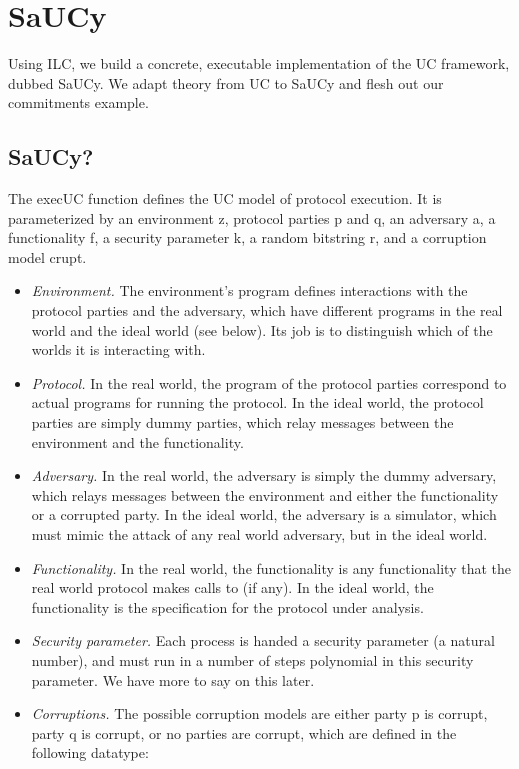 \section{SaUCy}
\label{sec:saucy}

Using ILC, we build a concrete, executable implementation of the UC framework,
dubbed SaUCy. We adapt theory from UC to SaUCy and flesh out our commitments
example.

\subsection{SaUCy?}
\label{subsec:saucy}

The \textsf{execUC} function defines the UC model of protocol execution. It is
parameterized by an environment \textsf{z}, protocol parties \textsf{p} and
\textsf{q}, an adversary \textsf{a}, a functionality \textsf{f}, a security
parameter \textsf{k}, a random bitstring \textsf{r}, and a corruption model
\textsf{crupt}.

\begin{itemize}[leftmargin=*]
  \item \emph{Environment.} The environment's program defines interactions with
    the protocol parties and the adversary, which have different programs in the
    real world and the ideal world (see below). Its job is to distinguish which
    of the worlds it is interacting with.
  \item \emph{Protocol.} In the real world, the program of the protocol parties
    correspond to actual programs for running the protocol. In the ideal world,
    the protocol parties are simply dummy parties, which relay messages between
    the environment and the functionality.
  \item \emph{Adversary.} In the real world, the adversary is simply the dummy
    adversary, which relays messages between the environment and either the
    functionality or a corrupted party. In the ideal world, the adversary is a
    simulator, which must mimic the attack of any real world adversary, but in
    the ideal world.
  \item \emph{Functionality.} In the real world, the functionality is any
    functionality that the real world protocol makes calls to (if any). In the
    ideal world, the functionality is the specification for the protocol under
    analysis.
  \item \emph{Security parameter.} Each process is handed a security parameter
    (a natural number), and must run in a number of steps polynomial in this
    security parameter. We have more to say on this later.
  \item \emph{Corruptions.} The possible corruption models are either party
    \textsf{p} is corrupt, party \textsf{q} is corrupt, or no parties are
    corrupt, which are defined in the following datatype:
    
\end{itemize}

